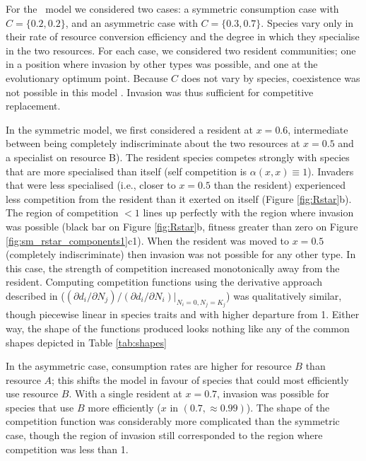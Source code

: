 \documentclass[a4paper,11pt]{article}
\begin{document}
For the \Rstar\ model we considered two cases: a symmetric
consumption case with $C = \{0.2, 0.2\}$, and an asymmetric case
with $C = \{0.3, 0.7\}$.  Species vary only in their rate of resource
conversion efficiency and the degree in which they specialise in the
two resources.  For each case, we considered two resident communities;
one in a position where invasion by other types was possible, and one at
the evolutionary optimum point.
%
Because $C$ does not vary by species, coexistence was not possible in
this model \citep{Tilman-1982}. Invasion was thus sufficient for
competitive replacement.

In the symmetric model, we first considered a resident at $x = 0.6$,
intermediate between being completely indiscriminate about the two resources
at $x=0.5$ and a specialist on resource B).
The resident species competes strongly with species that are more
specialised than itself (self competition is $\alpha(x, x) \equiv
1$). Invaders that were less specialised (i.e., closer to $x =
0.5$ than the resident) experienced less competition from the resident
than it exerted on itself (Figure \ref{fig:Rstar}b).
%
The region of competition $< 1$ lines up perfectly with the region
where invasion was possible (black bar on Figure \ref{fig:Rstar}b,
fitness greater than zero on Figure
\ref{fig:sm_rstar_components1}c1).
%
When the resident was moved to $x = 0.5$ (completely indiscriminate) then
invasion was not possible for any other type.  In this case, the strength of
competition increased monotonically away from the resident.
%
Computing competition functions using the derivative approach
described in \citet{Abrams-2008}
($(\partial d_i / \partial N_j) / (\partial d_i / \partial N_i) |_{N_i
  = 0, N_j = K_j}$)
was qualitatively similar, though piecewise linear in species traits
and with higher departure from 1.
Either way, the shape of the functions produced looks nothing like any of the
common shapes depicted in Table \ref{tab:shapes}

In the asymmetric case, consumption rates are higher for
resource $B$ than resource $A$; this shifts the model in favour of
species that could most efficiently use resource $B$.
%
With a single resident at $x = 0.7$, invasion was possible for species
that use $B$ more efficiently ($x$ in $(0.7, \approx 0.99)$).
%
The shape of the competition function was considerably more
complicated than the symmetric case, though the region of invasion
still corresponded to the region where competition was less than 1.
\end{document}
